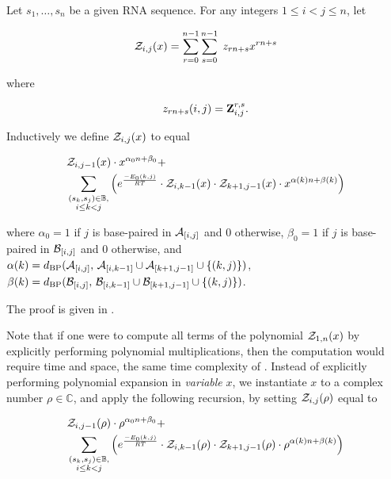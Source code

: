 \begin{theorem}
\label{thm:ffttwo:recursions}
Let $s_1,\dots,s_n$ be a given RNA sequence.
For any integers $1 \leq i < j \leq n$, let

\begin{align}
{\mathcal Z}_{i,j}(x) = \sum_{r=0}^{n-1} \sum_{s=0}^{n-1}\; z_{rn+s} x^{rn+s}
\end{align}

where

\begin{align}
z_{rn+s}(i,j) = {\bf Z}^{r,s}_{i,j}.
\end{align}

Inductively we define ${\mathcal Z}_{i,j}(x)$ to equal

\begin{align}
\label{eq:ffttwo:polyRecNussJac}
\begin{split}
&\emZof{i,j-1}{x} \cdot x^{\alpha_0n+\beta_0} + \\
&\sum_{\substack{(s_k,s_j) \in \bpSet,\\i\le k<j}}
\left(\boltzNuss{k,j}\cdot
\emZof{i,k-1}{x} \cdot \emZof{k+1,j-1}{x}\cdot x^{\alpha(k)n+\beta(k)} \right)
\end{split}
\end{align}

where $\alpha_0 = 1$ if $j$ is base-paired in $\mathcal A_{[i,j]}$ and 0 otherwise,
$\beta_0 = 1$ if $j$ is base-paired in $\mathcal B_{[i,j]}$ and 0 otherwise, and
$\alpha(k) =
d_{\text{BP}}(\mathcal A_{[i,j]},\,\mathcal A_{[i,k-1]} \cup \mathcal A_{[k+1,j-1]} \cup \{ (k,j) \})$,
$\beta(k) =
d_{\text{BP}}(\mathcal B_{[i,j]},\,\mathcal B_{[i,k-1]} \cup \mathcal B_{[k+1,j-1]} \cup \{ (k,j) \})$.

The proof is given in .
\end{theorem}

Note that if one were to compute all terms of the polynomial ${\mathcal Z}_{1,n}(x)$
by explicitly performing polynomial multiplications,
then the computation would require  time and  space, the
same time complexity of \rnatwofold \citep{hofacker:RNAbor2D}.
Instead of explicitly performing polynomial expansion in {\em variable} $x$,
we instantiate $x$ to a
complex number $\rho \in \mathbb{C}$, and apply
the following recursion, by setting ${\mathcal Z}_{i,j}(\rho)$ equal to

\begin{align}
\label{eq:ffttwo:polyRecNussJacInit}
\begin{split}
&\emZof{i,j-1}{\rho} \cdot \rho^{\alpha_0n+\beta_0} + \\
&\sum_{\substack{(s_k,s_j) \in \bpSet,\\i\le k<j}}
\left(\boltzNuss{k,j}\cdot
\emZof{i,k-1}{\rho} \cdot \emZof{k+1,j-1}{\rho}
\cdot \rho^{\alpha(k)n+\beta(k)} \right)
\end{split}
\end{align}

